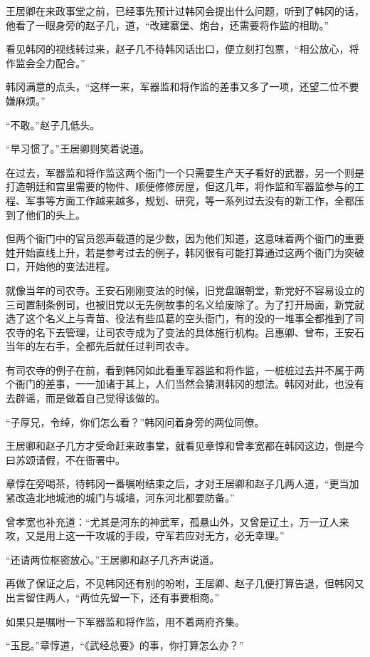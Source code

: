 王居卿在来政事堂之前，已经事先预计过韩冈会提出什么问题，听到了韩冈的话，他看了一眼身旁的赵子几，道，“改建寨堡、炮台，还需要将作监的相助。”

看见韩冈的视线转过来，赵子几不待韩冈话出口，便立刻打包票，“相公放心，将作监会全力配合。”

韩冈满意的点头，“这样一来，军器监和将作监的差事又多了一项，还望二位不要嫌麻烦。”

“不敢。”赵子几低头。

“早习惯了。”王居卿则笑着说道。

在过去，军器监和将作监这两个衙门一个只需要生产天子看好的武器，另一个则是打造朝廷和宫里需要的物件、顺便修修房屋，但这几年，将作监和军器监参与的工程、军事等方面工作越来越多，规划、研究，等一系列过去没有的新工作，全都压到了他们的头上。

但两个衙门中的官员怨声载道的是少数，因为他们知道，这意味着两个衙门的重要姓开始直线上升，若是参考过去的例子，韩冈很有可能打算通过这两个衙门为突破口，开始他的变法进程。

就像当年的司农寺。王安石刚刚变法的时候，旧党盘踞朝堂，新党好不容易设立的三司置制条例司，也被旧党以无先例故事的名义给废除了。为了打开局面，新党就选了这个名义上与青苗、役法有些瓜葛的空头衙门，有的没的一堆事全都推到了司农寺的名下去管理，让司农寺成为了变法的具体施行机构。吕惠卿、曾布，王安石当年的左右手，全都先后就任过判司农寺。

有司农寺的例子在前，看到韩冈如此看重军器监和将作监，一桩桩过去并不属于两个衙门的差事，一一加诸于其上，人们当然会猜测韩冈的想法。韩冈对此，也没有去辟谣，而是做着自己觉得该做的。

“子厚兄，令绰，你们怎么看？”韩冈问着身旁的两位同僚。

王居卿和赵子几方才受命赶来政事堂，就看见章惇和曾孝宽都在韩冈这边，倒是今曰苏颂请假，不在衙署中。

章惇在旁喝茶，待韩冈一番嘱咐结束之后，才对王居卿和赵子几两人道，“更当加紧改造北地城池的城门与城墙，河东河北都要防备。”

曾孝宽也补充道：“尤其是河东的神武军，孤悬山外，又曾是辽土，万一辽人来攻，又是用上这一干攻城的手段，守军若应对无方，必无幸理。”

“还请两位枢密放心。”王居卿和赵子几齐声说道。

再做了保证之后，不见韩冈还有别的吩咐，王居卿、赵子几便打算告退，但韩冈又出言留住两人，“两位先留一下，还有事要相商。”

如果只是嘱咐一下军器监和将作监，用不着两府齐集。

“玉昆。”章惇道，“《武经总要》的事，你打算怎么办？”

